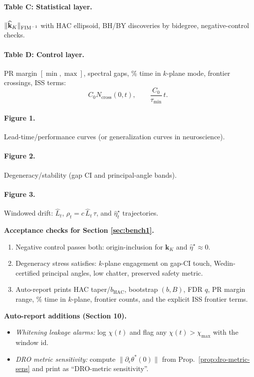 \paragraph{Table C: Statistical layer.} $\|\widehat{\mathbf k}_K\|_{\mathrm{FIM}^{-1}}$ with HAC ellipsoid, BH/BY discoveries by bidegree, negative-control checks.

\paragraph{Table D: Control layer.} PR margin \([ \min,\max]\), spectral gaps, \% time in $k$-plane mode, frontier crossings, ISS terms:
\[
C_0 N_{\mathrm{cross}}(0,t),\qquad \frac{C_0}{\tau_{\min}}\,t.
\]

\paragraph{Figure 1.} Lead-time/performance curves (or generalization curves in neuroscience).  
\paragraph{Figure 2.} Degeneracy/stability (gap CI and principal-angle bands).  
\paragraph{Figure 3.} Windowed drift: $\widehat L_t$, $\rho_t=c\,\widehat L_t\,\tau$, and $\widehat\eta^\star_t$ trajectories.

\begin{mdframed}
\textbf{Acceptance checks for Section \ref{sec:bench1}.}
\begin{enumerate}[leftmargin=*]
\item Negative control passes both: origin-inclusion for $\mathbf k_K$ and $\widehat\eta^\star\approx 0$.
\item Degeneracy stress satisfies: $k$-plane engagement on gap-CI touch, Wedin-certified principal angles, low chatter, preserved safety metric.
\item Auto-report prints HAC taper/$b_{\mathrm{HAC}}$, bootstrap $(b,B)$, FDR $q$, PR margin range, \% time in $k$-plane, frontier counts, and the explicit ISS frontier terms.
\end{enumerate}
\end{mdframed}

\begin{mdframed}
\textbf{Auto-report additions (Section 10).}
\begin{itemize}[leftmargin=*]
\item \emph{Whitening leakage alarms:} log $\chi(t)$ and flag any $\chi(t)>\chi_{\max}$ with the window id.
\item \emph{DRO metric sensitivity:} compute $\|\partial_\epsilon\theta^*(0)\|$ from Prop.~\ref{prop:dro-metric-sens} and print as ``DRO-metric sensitivity''.
\end{itemize}
\end{mdframed}

